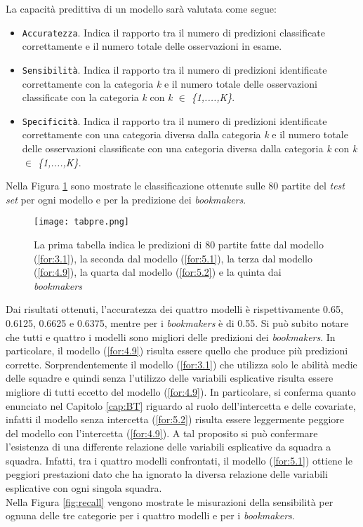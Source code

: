 La capacità predittiva di un modello sarà valutata come segue:
\begin{itemize}
	\item \texttt{Accuratezza}. Indica il rapporto tra il numero di predizioni classificate correttamente e il numero totale delle osservazioni in esame.
	\item \texttt{Sensibilità}. Indica il rapporto tra il numero di predizioni identificate correttamente con la categoria \emph{k} e il numero totale delle osservazioni classificate con la categoria \emph{k} con \emph{k $\in$ \{1,....,K\}}.
	\item \texttt{Specificità}. Indica il rapporto tra il numero di predizioni identificate correttamente con una categoria diversa dalla categoria \emph{k} e il numero totale delle osservazioni classificate con una categoria diversa dalla categoria \emph{k} con \emph{k $\in$ \{1,....,K\}}.
\end{itemize}
Nella Figura \ref{fig:pre} sono mostrate le classificazione ottenute sulle 80 partite del \emph{test set} per ogni modello e per la predizione dei \emph{bookmakers}.
\begin{figure}[htbp]
	\begin{center}
		\texttt{[image: tabpre.png]}
		\caption{La prima tabella indica le predizioni di 80 partite fatte dal modello (\ref{for:3.1}), la seconda dal modello (\ref{for:5.1}), la terza dal modello (\ref{for:4.9}), la quarta dal modello (\ref{for:5.2}) e la quinta dai \emph{bookmakers}
			\label{fig:pre}}
	\end{center}
\end{figure}
Dai risultati ottenuti, l'accuratezza dei quattro modelli è rispettivamente 0.65, 0.6125, 0.6625 e 0.6375, mentre per i \emph{bookmakers} è di 0.55. Si può subito notare che tutti e quattro i modelli sono migliori delle predizioni dei \emph{bookmakers}. In particolare, il modello (\ref{for:4.9}) risulta essere quello che produce più predizioni corrette. Sorprendentemente il modello (\ref{for:3.1}) che utilizza solo le abilità medie delle squadre e quindi senza l'utilizzo delle variabili esplicative risulta essere migliore di tutti eccetto del modello (\ref{for:4.9}). In particolare, si conferma quanto enunciato nel Capitolo \ref{cap:BT} riguardo al ruolo dell'intercetta e delle covariate, infatti il modello senza intercetta (\ref{for:5.2}) risulta essere leggermente peggiore del modello con l'intercetta (\ref{for:4.9}). A tal proposito si può confermare l'esistenza di una differente relazione delle variabili esplicative da squadra a squadra. Infatti, tra i quattro modelli confrontati, il modello (\ref{for:5.1}) ottiene le peggiori prestazioni dato che ha ignorato la diversa relazione delle variabili esplicative con ogni singola squadra.\\
Nella Figura \ref{fig:recall} vengono mostrate le misurazioni della sensibilità per ognuna delle tre categorie per i quattro modelli e per i \emph{bookmakers}.

